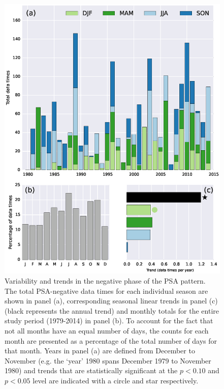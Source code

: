 \begin{figure}
\begin{center}
\includegraphics[width=0.7\columnwidth]{figures/psa/psa-seasonality-psa-neg_ERAInterim_500hPa-lat10S10Nmean-lon115E235Ezeropad_030day-runmean-anom-wrt-all_native-np20N260E.eps}
\caption{\label{fig:psa-neg_seasonality}
Variability and trends in the negative phase of the PSA pattern. The total PSA-negative data times for each individual season are shown in panel (a), corresponding seasonal linear trends in panel (c) (black represents the annual trend) and monthly totals for the entire study period (1979-2014) in panel (b). To account for the fact that not all months have an equal number of days, the counts for each month are presented as a percentage of the total number of days for that month. Years in panel (a) are defined from December to November (e.g. the `year' 1980 spans December 1979 to November 1980) and trends that are statistically significant at the $p < 0.10$ and $p < 0.05$ level are indicated with a circle and star respectively.%
}
\end{center}
\end{figure}

